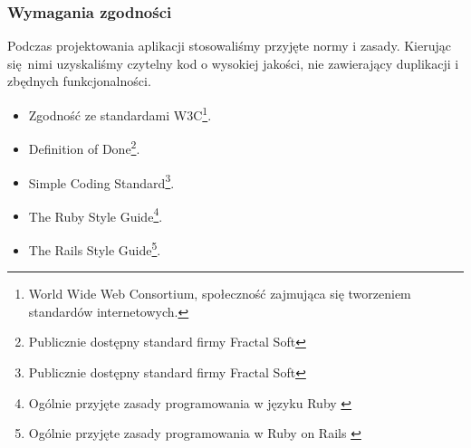   \subsubsection{Wymagania zgodności}
    Podczas projektowania aplikacji stosowaliśmy przyjęte normy i zasady. Kierując się nimi uzyskaliśmy czytelny kod o wysokiej jakości, nie zawierający duplikacji i zbędnych funkcjonalności.
    \begin{itemize}
      \item Zgodność ze standardami W3C\footnote{World Wide Web Consortium, społeczność zajmująca się tworzeniem standardów internetowych.}.
      \item Definition of Done\footnote{Publicznie dostępny standard firmy Fractal Soft\cite{dod}}.
      \item Simple Coding Standard\footnote{Publicznie dostępny standard firmy Fractal Soft\cite{scs}}.
      \item The Ruby Style Guide\footnote{Ogólnie przyjęte zasady programowania w języku Ruby \cite{ruby_style_guide}}.
      \item The Rails Style Guide\footnote{Ogólnie przyjęte zasady programowania w Ruby on Rails \cite{rails_style_guide}}.
    \end{itemize}
